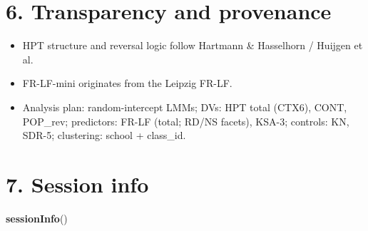 \documentclass[
  10pt,
]{article}
\newenvironment{Shaded}{\begin{snugshade}}{\end{snugshade}}
\newcommand{\FunctionTok}[1]{\textcolor[rgb]{0.13,0.29,0.53}{\textbf{#1}}}
\newcommand{\NormalTok}[1]{#1}
\providecommand{\tightlist}{%
  \setlength{\itemsep}{0pt}\setlength{\parskip}{0pt}}
\begin{document}
\hypertarget{transparency-and-provenance}{%
\section{6. Transparency and
provenance}\label{transparency-and-provenance}}

\begin{itemize}
\tightlist
\item
  HPT structure and reversal logic follow Hartmann \& Hasselhorn /
  Huijgen et al.
\item
  FR-LF-mini originates from the Leipzig FR-LF.
\item
  Analysis plan: random-intercept LMMs; DVs: HPT total (CTX6), CONT,
  POP\_rev; predictors: FR-LF (total; RD/NS facets), KSA-3; controls:
  KN, SDR-5; clustering: school + class\_id.
\end{itemize}

\hypertarget{session-info}{%
\section{7. Session info}\label{session-info}}

\begin{Shaded}
\begin{Highlighting}[]
\FunctionTok{sessionInfo}\NormalTok{()}
\end{Highlighting}
\end{Shaded}
\end{document}
